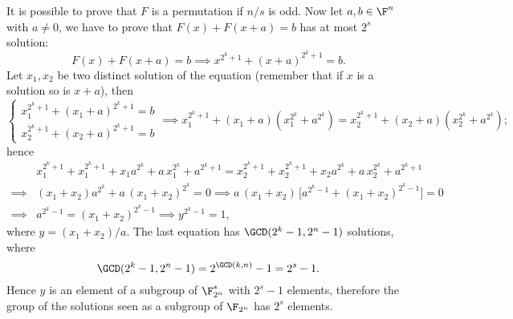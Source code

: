\begin{sol}
	It is possible to prove that \(F\) is a permutation if \(n/s\) is odd.
	Now let \(a,b\in\F^n\) with \(a\neq 0\), we have to prove that \(F(x)+F(x+a)=b\) has at most \(2^s\) solution:
	\[
		F(x)+F(x+a)=b \implies x^{2^k+1} + (x+a)^{2^k+1} = b.
	\]
	Let \(x_1,x_2\) be two distinct solution of the equation (remember that if \(x\) is a solution so is \(x+a\)), then
	\[
		\begin{cases}
			x_1^{2^k+1}+(x_1+a)^{2^k+1} = b \\
			x_2^{2^k+1}+(x_2+a)^{2^k+1} = b
		\end{cases}
		\implies x_1^{2^k+1} + (x_1+a)(x_1^{2^k}+a^{2^k}) = x_2^{2^k+1}+(x_2+a)(x_2^{2^k}+a^{2^k});
	\]
	hence
	\begin{align*}
		         & x_1^{2^k+1}+x_1^{2^k+1}+x_1 a^{2^k}+a\,x_1^{2^k}+a^{2^k+1} = x_2^{2^k+1}+x_2^{2^k+1}+x_2 a^{2^k}+a\,x_2^{2^k}+a^{2^k+1} \\
		\implies & (x_1+x_2) a^{2^k} + a\,(x_1+x_2)^{2^k} = 0 \implies a\,(x_1+x_2)\,\big[a^{2^k-1}+(x_1+x_2)^{2^k-1}\big] = 0             \\
		\implies & a^{2^k-1} = (x_1+x_2)^{2^k-1} \implies y^{2^k-1} = 1,
	\end{align*}
	where \(y = (x_1+x_2)/a\).
	The last equation has \(\GCD(2^k-1,2^n-1)\) solutions, where
	\[
		\GCD(2^k-1,2^n-1) = 2^{\GCD(k,n)}-1 = 2^s-1.
	\]
	Hence \(y\) is an element of a subgroup of \(\F_{2^n}^*\) with \(2^s-1\) elements, therefore the group of the solutions seen as a subgroup of \(\F_{2^n}\) has \(2^s\) elements.
\end{sol}